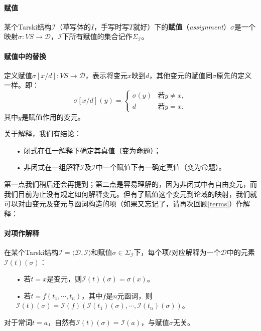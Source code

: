 \documentclass[b5paper,oneside]{ctexbook}
\begin{document}
\paragraph{赋值}某个Tarski结构$\mathscr{I}$（草写体的$I$，手写时写$T$就好）下的\textbf{赋值}（\textit{assignment}）$\sigma$是一个映射$\sigma:VS\to\mathcal D$，$\mathscr{I}$下所有赋值的集合记作$\Sigma_\mathscr{I}$。
\paragraph{赋值中的替换}定义赋值$\sigma [x/d]:VS\to \mathcal D$，表示将变元$x$映到$d$，其他变元的赋值同$\sigma$原先的定义一样。即：
\[\sigma [x/d](y)=\begin{cases}
\sigma(y)&\text{若}y\neq x,
\\d&\text{若}y=x.
\end{cases}\]
其中$y$是赋值作用的变元。

关于解释，我们有结论：
\begin{enumerate}
\item[•]闭式在任一解释下确定其真值（变为命题）；
\item[•]非闭式在一组解释$\mathcal{I}$及$\mathscr{I}$中一个赋值下有一确定真值（变为命题）。
\end{enumerate}

第一点我们稍后还会再提到；第二点是容易理解的，因为非闭式中有自由变元，而我们目前为止没有规定如何解释变元。但有了赋值这个变元到论域的映射，我们就可以对由变元及变元与函词构造的项（如果又忘记了，请再次回顾\ref{terms}）作解释：
\paragraph{对项作解释}在某个Tarski结构$\mathscr{I}=\langle\mathcal D,\mathcal I\rangle$和赋值$\sigma\in\Sigma_\mathscr I$下，每个项$t$对应解释为一个$\mathcal D$中的元素$\mathscr I(t)(\sigma)$：
\begin{enumerate}
\item[•]若$t=x$是变元，则$\mathscr I(t)(\sigma)=\sigma(x)$。
\item[•]若$t=f(t_1,\cdots ,t_n)$，其中$f$是$n$元函词，则$\mathscr I(t)(\sigma)=\mathcal{I}(f)(\mathscr I(t_1)(\sigma),\cdots ,\mathscr I(t_n)(\sigma))$。
\end{enumerate}
对于常词$t=a$，自然有$\mathscr I(t)(\sigma)=\mathcal{I}(a)$，与赋值$\sigma$无关。
\end{document}
